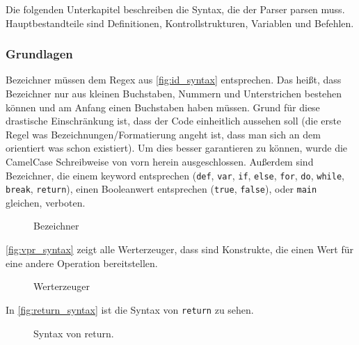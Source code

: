     Die folgenden Unterkapitel beschreiben die Syntax, die der Parser parsen muss. Hauptbestandteile sind Definitionen, Kontrollstrukturen, Variablen und Befehlen.

    \subsubsection{Grundlagen}
    \label{sssec:Grundlagen}
      Bezeichner müssen dem Regex aus \autoref{fig:id_syntax} entsprechen. Das heißt, dass Bezeichner nur aus kleinen Buchstaben, Nummern und Unterstrichen bestehen können und am Anfang einen Buchstaben haben müssen. Grund für diese drastische Einschränkung ist, dass der Code einheitlich aussehen soll (die erste Regel was Bezeichnungen/Formatierung angeht ist, dass man sich an dem orientiert was schon existiert). Um dies besser garantieren zu können, wurde die CamelCase Schreibweise von vorn herein ausgeschlossen. Außerdem sind Bezeichner, die einem keyword entsprechen
      (\lstinline[style=MyMacroStyle]$def$, \lstinline[style=MyMacroStyle]$var$, \lstinline[style=MyMacroStyle]$if$, \lstinline[style=MyMacroStyle]$else$, \lstinline[style=MyMacroStyle]$for$, \lstinline[style=MyMacroStyle]$do$, \lstinline[style=MyMacroStyle]$while$, \lstinline[style=MyMacroStyle]$break$, \lstinline[style=MyMacroStyle]$return$), einen Booleanwert entsprechen (\lstinline[style=MyMacroStyle]$true$, \lstinline[style=MyMacroStyle]$false$), oder \lstinline[style=MyMacroStyle]$main$ gleichen, verboten.

      \begin{figure}[H]
        \centering
        \caption{Bezeichner}
        \label{fig:id_syntax}
      \end{figure}

      \autoref{fig:vpr_syntax} zeigt alle Werterzeuger, dass sind Konstrukte, die einen Wert für eine andere Operation bereitstellen.
      \begin{figure}[H]
        \centering
        \caption{Werterzeuger}
        \label{fig:vpr_syntax}
      \end{figure}

      In \autoref{fig:return_syntax} ist die Syntax von \lstinline[style=MyMacroStyle]$return$ zu sehen.
      \begin{figure}[H]
        \centering
        \caption{Syntax von return.}
        \label{fig:return_syntax}
      \end{figure}


